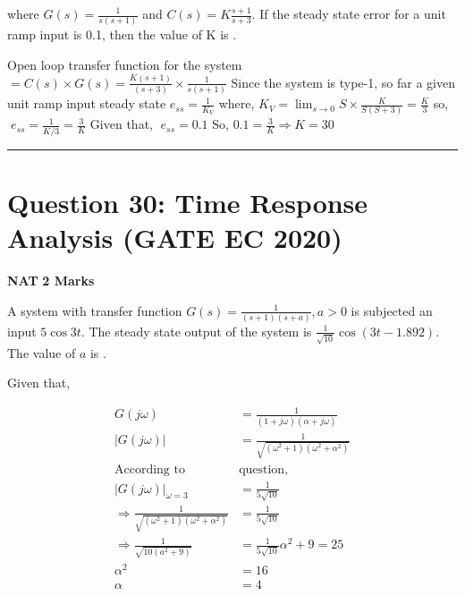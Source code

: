 \documentclass[11pt,a4paper]{article}
\begin{document}
 where $G(s)=\frac{1}{s(s+1)}$ and $C(s)=K\frac{s+1}{s+3}$.
If the steady state error for a unit ramp input
is 0.1, then the value of K is \underline{\hspace{1.5cm}}.


\begin{tcolorbox}[solbox, title=Detailed Solution -- Question 29]
Open loop transfer function for the system $=C(s)\times G(s)=\frac{K(s+1)}{ (s+3)}\times \frac{1}{s(s+1)}$
Since the system is type-1, so far a given unit ramp input steady state
$e_{ss}=\frac{1}{K_{V}}$
where,  $K_{V}=\lim_{s\rightarrow 0}S\times \frac{K}{S(S+3)}=\frac{K}{3}$
so, $\; e_{ss}=\frac{1}{K/3}=\frac{3}{K}$
 Given that,  $\; e_{ss}=0.1$
So, $0.1=\frac{3}{K}\Rightarrow K=30$
\end{tcolorbox}

\vspace{1.5em}
\hrule
\vspace{1.5em}

\section*{Question 30: Time Response Analysis (GATE EC 2020)}
\noindent \textbf{\color{primary}NAT} \hfill \textbf{\color{secondary}2 Marks}


\noindent A system with transfer function $G(s)=\frac{1}{(s+1)(s+a)}, a > 0$ is subjected an input $5\cos 3t$.
The steady state output of the system is $\frac{1}{\sqrt{10}} \cos (3t-1.892)$. The value of $a$ is \underline{\hspace{1.5cm}}.


\begin{tcolorbox}[solbox, title=Detailed Solution -- Question 30]
Given that,

\[
\begin{aligned}G(j\omega )&=\frac{1}{(1+j\omega )(\alpha +j\omega )} \\ \left |G(j\omega ) \right |&=\frac{1}{\sqrt{(\omega ^{2}+1)(\omega ^{2}+\alpha ^{2})}} \\ \text{According to }& \text{question,}\\ \left | G(j\omega ) \right |_{\omega =3}&=\frac{1}{5\sqrt{10}}\\ \Rightarrow \frac{1}{\sqrt{(\omega ^{2}+1)(\omega ^{2}+\alpha ^{2})}}&=\frac{1}{5\sqrt{10}} \\ \Rightarrow \frac{1}{\sqrt{10(a^{2}+9)}}&=\frac{1}{5\sqrt{10}} \alpha ^{2}+9=25 \\ \alpha ^{2}&=16 \\ \alpha &=4\end{aligned}
\]
\end{tcolorbox}
\end{document}
